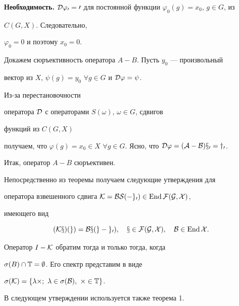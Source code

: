 \begin{pf}{\bf Необходимость.}
$\cal D\varphi_0=0$ для постоянной функции $\varphi_0(g)=x_0$, $g\in G$, из 


$C(G,X)$. Следовательно, 


$\varphi_0=0$ и поэтому $x_0=0$. 


 


Докажем сюръективность оператора $A-B$. Пусть $y_0$ --- произвольный 


вектор из $X$, $\psi(g)=y_0$ $\forall g\in G$ и $\cal D\varphi=\psi$. 


Из-за перестановочности 


оператора $\cal D$ с операторами $S(\omega)$, $\omega\in G$, сдвигов 


функций из $C(G,X)$ 


получаем, что $\varphi(g)=x_0\in X$ $\forall g\in G$. Ясно, что $\cal 


D\varphi=(A-B)x_0=y_0$. 


Итак, оператор $A-B$ сюръективен. 


\end{pf} 


 


Непосредственно из теоремы получаем следующие утверждения для 


оператора взвешенного сдвига $\cal K=B S(-g_0)\in\operatorname{End}\cal F(G,X)$, 


имеющего вид 


$$ 


(\cal K x)(g)=B x(g-g_0),\quad x\in\cal F(G,X),\quad 


B\in\End X. 


$$ 


 


\begin{cor} 


Оператор $I-\cal K$ обратим тогда и только тогда, когда 


$\sigma(B)\cap\Bbb T=\emptyset$. Его спектр представим в виде 


$\sigma(\cal K)=\{\lambda\Theta;\ \lambda\in\sigma(B),\ \Theta\in\Bbb 


T\}$. 


\end{cor} 


 


В следующем утверждении используется также теорема 1. 


